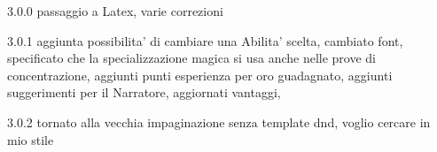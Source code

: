 \documentclass[a4paper,11pt,twoside,openany]{book}
\begin{document}
{3.0.0 passaggio a Latex, varie correzioni

3.0.1 aggiunta possibilita' di cambiare una Abilita' scelta, cambiato font, specificato che la specializzazione magica si usa anche nelle prove di concentrazione, aggiunti punti esperienza per oro guadagnato, aggiunti suggerimenti per il Narratore, aggiornati vantaggi, 


3.0.2 tornato alla vecchia impaginazione senza template dnd, voglio cercare in mio stile

}
\end{document}
